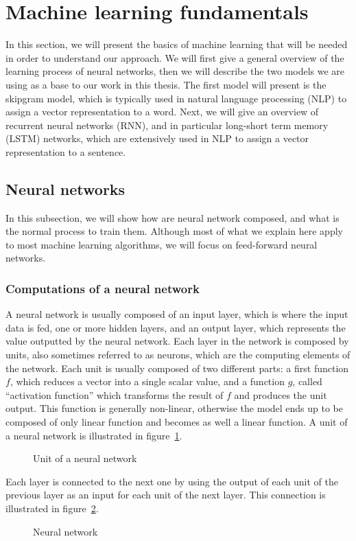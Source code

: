 \section{Machine learning fundamentals}
In this section, we will present the basics of machine learning that will be
needed in order to understand our approach. We will first give a general
overview of the learning process of neural networks, then we will describe
the two models we are using as a base to our work in this thesis.
The first model will present is the skipgram model, which is typically used in
natural language processing (NLP) to assign a vector representation to a word.
Next, we will give an overview of recurrent neural networks (RNN), and in
particular long-short term memory (LSTM) networks, which are extensively used in
NLP to assign a vector representation to a sentence.
\subsection{Neural networks}
In this subsection, we will show how are neural network composed, and what is
the normal process to train them. Although most of what we explain here apply to
most machine learning algorithms, we will focus on feed-forward neural networks.
\subsubsection{Computations of a neural network}
A neural network \cite{Rojas:1996:NNS:235222} is usually composed of an input
layer, which is where the input data is fed, one or more hidden layers, and an
output layer, which represents the value outputted by the neural network.
Each layer in the network is composed by units, also sometimes referred to as
neurons, which are the computing elements of the network. Each unit is usually
composed of two different parts: a first function $f$, which reduces a vector
into a single scalar value, and a function $g$, called ``activation function''
which transforms the result of $f$ and produces the unit output. This function
is generally non-linear, otherwise the model ends up to be composed of only
linear function and becomes as well a linear function.
A unit of a neural network is illustrated in figure~\ref{fig:neuron}.
\begin{figure}[tb]
  \centering
  \caption{\label{fig:neuron}Unit of a neural network}
\end{figure}
Each layer is connected to the next one by using the output of each unit of the
previous layer as an input for each unit of the next layer. This connection is
illustrated in figure~\ref{fig:neural-net}.
\begin{figure}[tb]
  \centering
  \caption{\label{fig:neural-net}Neural network}
\end{figure}

